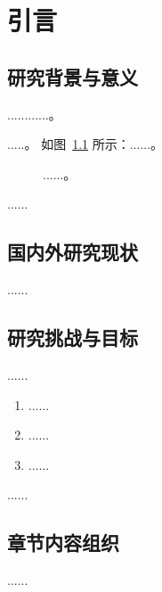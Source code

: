 
\chapter{引言}

\section{研究背景与意义}

......\cite{cormen2022introduction}......。

.....\cite{lecun2015deep,李晓磊2002一种基于动物自治体的寻优模式}。
如图~\ref{fig:图的标签} 所示：......。

\begin{figure}[!htbp]
      \centering
      \caption{......。}\label{fig:图的标签}
\end{figure}

......

\section{国内外研究现状}

......

\section{研究挑战与目标}

......

\begin{enumerate}[wide=\parindent]
      \item ......
      \item ......
      \item ......
\end{enumerate}

......

\section{章节内容组织}

......
